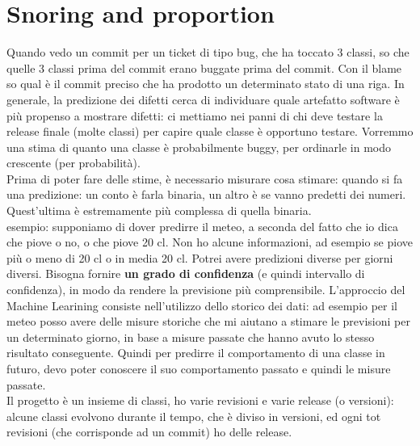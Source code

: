 \documentclass{article}
\begin{document}
\section{Snoring and proportion}
Quando vedo un commit per un ticket di tipo bug, che ha toccato 3 classi, so che quelle 3 classi prima del commit erano buggate prima del commit. Con il blame so qual è il commit preciso che ha prodotto un determinato stato di una riga. In generale, la predizione dei difetti cerca di individuare quale artefatto software è più propenso a mostrare difetti: ci mettiamo nei panni di chi deve testare la release finale (molte classi) per capire quale classe è opportuno testare. Vorremmo una stima di quanto una classe è probabilmente buggy, per ordinarle in modo crescente (per probabilità).\\ Prima di poter fare delle stime, è necessario misurare cosa stimare: quando si fa una predizione: un conto è farla binaria, un altro è se vanno predetti dei numeri. Quest'ultima è estremamente più complessa di quella binaria.\\ esempio: supponiamo di dover predirre il meteo, a seconda del fatto che io dica che piove o no, o che piove 20 cl. Non ho alcune informazioni, ad esempio se piove più o meno di 20 cl o in media 20 cl. Potrei avere predizioni diverse per giorni diversi. Bisogna fornire \textbf{un grado di confidenza} (e quindi intervallo di confidenza), in modo da rendere la previsione più comprensibile. L'approccio del Machine Learining consiste nell'utilizzo dello storico dei dati: ad esempio per il meteo posso avere delle misure storiche che mi aiutano a stimare le previsioni per un determinato giorno, in base a misure passate che hanno avuto lo stesso risultato conseguente. Quindi per predirre il comportamento di una classe in futuro, devo poter conoscere il suo comportamento passato e quindi le misure passate.\\ Il progetto è un insieme di classi, ho varie revisioni e varie release (o versioni): alcune classi evolvono durante il tempo, che è diviso in versioni, ed ogni tot revisioni (che corrisponde ad un commit) ho delle release.
\end{document}
